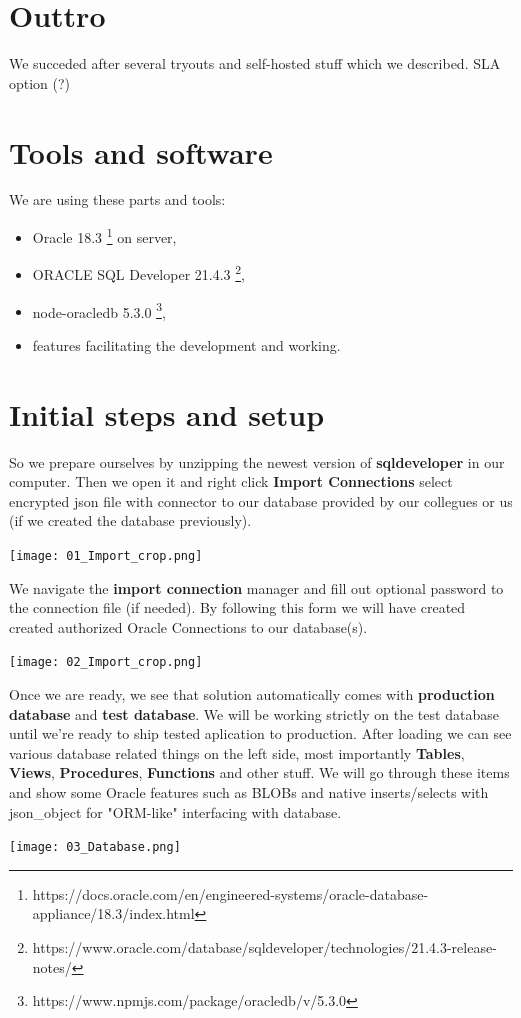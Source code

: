 \documentclass{article}
\begin{document}
\section{Outtro}
We succeded after several tryouts and self-hosted stuff which we described.
SLA option (?)
\section{Tools and software}

We are using these parts and tools:
\begin{itemize}
\item Oracle 18.3 \footnote{https://docs.oracle.com/en/engineered-systems/oracle-database-appliance/18.3/index.html} on server,
\item ORACLE SQL Developer 21.4.3 \footnote{https://www.oracle.com/database/sqldeveloper/technologies/21.4.3-release-notes/},
\item node-oracledb 5.3.0 \footnote{https://www.npmjs.com/package/oracledb/v/5.3.0},
\item features facilitating the development and working.
\end{itemize}

\newpage

\section{Initial steps and setup}
So we prepare ourselves by unzipping the newest version of \textbf{sqldeveloper} in our computer. Then we open it and right click \textbf{Import Connections} select encrypted json file with connector to our database provided by our collegues or us (if we created the database previously).  \par
\begin{center}
\texttt{[image: 01\_Import\_crop.png]}
\end{center}
We navigate the \textbf{import connection} manager and fill out optional password to the connection file (if needed). By following this form we will have created created authorized Oracle Connections to our database(s). \par
\begin{center}
  \texttt{[image: 02\_Import\_crop.png]}
\end{center}
Once we are ready, we see that solution automatically comes with \textbf{production database} and \textbf{test database}. We will be working strictly on the test database until we're ready to ship tested aplication to production. After loading we can see various database related things on the left side, most importantly \textbf{Tables}, \textbf{Views}, \textbf{Procedures}, \textbf{Functions} and other stuff. We will go through these items and show some Oracle features such as BLOBs and native inserts/selects with json\_object for "ORM-like" interfacing with database. \par
\begin{center}
  \texttt{[image: 03\_Database.png]}
\end{center}
\end{document}
